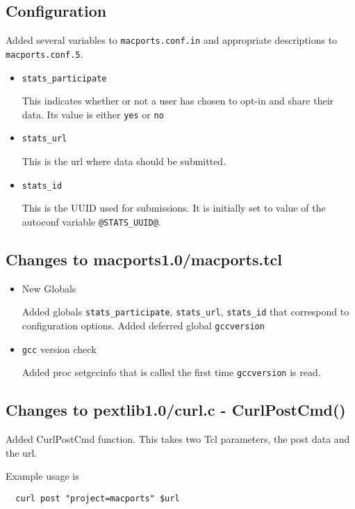 \documentclass[10pt]{article}
\begin{document}
\subsection{Configuration}

Added several variables to \texttt{macports.conf.in} and appropriate descriptions to \texttt{macports.conf.5}.

\begin{itemize}
  \item \texttt{stats\_participate} 
  
  This indicates whether or not a user has chosen to opt-in and share their data. Its value is either \texttt{yes} or \texttt{no}
  
  \item \texttt{stats\_url}
  
  This is the url where data should be submitted.
  
  \item \texttt{stats\_id}
  
  This is the UUID used for submissions. It is initially set to value of the autoconf variable \texttt{@STATS\_UUID@}.
\end{itemize}

\subsection{Changes to macports1.0/macports.tcl}
\begin{itemize}
  \item New Globals
  
    Added globals \texttt{stats\_participate}, \texttt{stats\_url}, \texttt{stats\_id} that correspond to configuration options. \newline
    Added deferred global \texttt{gccversion}
  \item \texttt{gcc} version check
  
    Added proc setgccinfo that is called the first time \texttt{gccversion} is read.
\end{itemize}

\subsection{Changes to pextlib1.0/curl.c - CurlPostCmd()}

Added CurlPostCmd function. This takes two Tcl parameters, the post data and the url.

Example usage is 
\begin{verbatim}
  curl post "project=macports" $url
\end{verbatim}
\end{document}
